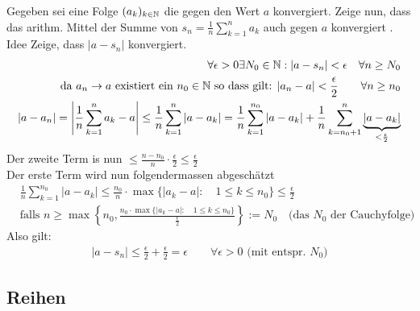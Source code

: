 \documentclass[a4paper]{article}
\begin{document}
	\begin{fmerke}
		Gegeben sei eine Folge $(a_k)_{k \in \mathbb{N}}$ die gegen den Wert $a$ konvergiert. Zeige nun, dass das arithm. Mittel der Summe von $s_n = \frac{1}{n} \sum_{k=1}^n a_k$ auch gegen $a$ konvergiert . Idee Zeige, dass $|a-s_n|$ konvergiert.
		\begin{align*}
			\forall \epsilon > 0 \exists N_0 \in \mathbb{N}: |a-s_n| < \epsilon \quad \forall n \geq N_0\\
			\text{da $a_n \rightarrow a$ existiert ein $n_0 \in \mathbb{N}$ so dass gilt: } |a_n -a| < \frac{\epsilon}{2} \qquad \forall n \geq n_0\\
			|a - a_n| = \left|\frac{1}{n}\sum_{k=1}^n a_k -a \right| \leq \frac{1}{n} \sum_{k=1}^n |a - a_k|
					= \frac{1}{n} \sum_{k=1}^{n_0} |a - a_k| + \frac{1}{n} \sum_{k=n_0+1}^n \underbrace{|a - a_k|}_{< \frac{\epsilon}{2}}
		\end{align*}
		Der zweite Term is nun $\leq \frac{n - n_0}{n} \cdot \frac{\epsilon}{2} \leq \frac{\epsilon}{2}$\\
		Der erste Term wird nun folgendermassen abgeschätzt
		\begin{align*}
			&\frac{1}{n} \sum_{k=1}^{n_0} |a-a_k|  \leq \frac{n_0}{n} \cdot \max \{|a_k-a|: \quad 1 \leq k \leq n_0 \} \leq \frac{\epsilon}{2} \\ 
			&\text{falls } n \geq \max \left\{ n_0, \frac{n_0 \cdot  \max \{|a_k-a|: \quad 1 \leq k \leq n_0 \}}{\frac{\epsilon}{2}} \right\} := N_0 \quad \text{(das $N_0$ der Cauchyfolge)}
		\end{align*}
		Also gilt:
		\begin{align*}
			|a-s_n| \leq \frac{\epsilon}{2} + \frac{\epsilon}{2} = \epsilon \qquad \forall \epsilon > 0 \text{ (mit entspr. $N_0$)}
		\end{align*}


	\end{fmerke}

	



\subsection{Reihen}
\end{document}
